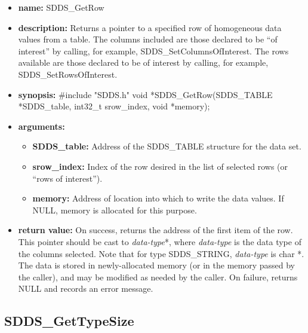 \documentclass[11pt]{article}
\begin{document}
\begin{itemize}
\item {\bf name:}\newline
SDDS\_GetRow
\item {\bf description:}\newline
Returns a pointer to a specified row of homogeneous data values from a table. The columns included are those declared to be ``of interest'' by calling, for example, SDDS\_SetColumnsOfInterest. The rows available are those declared to be of interest by calling, for example, SDDS\_SetRowsOfInterest.
\item {\bf synopsis:} \#include "SDDS.h"\newline
void *SDDS\_GetRow(SDDS\_TABLE *SDDS\_table, int32\_t srow\_index, void *memory);
\item {\bf arguments:}
\begin{itemize}
\item {\bf SDDS\_table:} Address of the SDDS\_TABLE structure for the data set.
\item {\bf srow\_index:} Index of the row desired in the list of selected rows (or ``rows of interest'').
\item {\bf memory:} Address of location into which to write the data values. If NULL, memory is allocated for this purpose.
\end{itemize}
\item {\bf return value:}\newline
On success, returns the address of the first item of the row. This pointer should be cast to {\em data-type}*, where {\em data-type} is the data type of the columns selected. Note that for type SDDS\_STRING, {\em data-type} is char *. The data is stored in newly-allocated memory (or in the memory passed by the caller), and may be modified as needed by the caller.\newline
\newline
On failure, returns NULL and records an error message. 
\end{itemize}

\subsection{SDDS\_GetTypeSize}
\label{SDDS_GetTypeSize}
\end{document}
